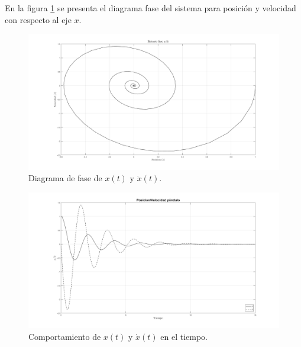 En la figura \ref{fig: phase plot x} 
se presenta el diagrama fase del sistema para
posición y velocidad con respecto al eje $x$.

\begin{figure}[hb]
 \centering 
 \includegraphics[scale=0.15]{./img/fasependulox.png}
 \caption{Diagrama de fase de $x(t)$ y $\dot{x}(t)$.}
 \label{fig: phase plot x}
\end{figure}



\begin{figure}[hb]
 \centering 
 \includegraphics[scale=0.15]{./img/posvelpendulo.png}
 \caption{Comportamiento de $x(t)$ y $\dot{x}(t)$ en el tiempo.}
 \label{fig: time plot x dx}
\end{figure}
